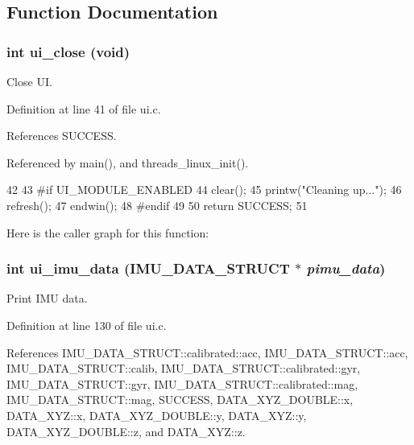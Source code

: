 \subsection{Function Documentation}
\hypertarget{group__ui_ga65d8b92b634da17c344458cd57e61f3e}{
\subsubsection[{ui\_\-close}]{\setlength{\rightskip}{0pt plus 5cm}int ui\_\-close (void)}}
\label{group__ui_ga65d8b92b634da17c344458cd57e61f3e}


Close UI. 



Definition at line 41 of file ui.c.



References SUCCESS.



Referenced by main(), and threads\_\-linux\_\-init().




\begin{DoxyCode}
42 {
43     #if UI_MODULE_ENABLED
44         clear();
45         printw("Cleaning up...\n");
46         refresh();
47         endwin();
48     #endif
49 
50           return SUCCESS;
51 }
\end{DoxyCode}




Here is the caller graph for this function:

\hypertarget{group__ui_ga7d5a9d9a75693709de408781d001a6a6}{
\subsubsection[{ui\_\-imu\_\-data}]{\setlength{\rightskip}{0pt plus 5cm}int ui\_\-imu\_\-data ({\bf IMU\_\-DATA\_\-STRUCT} $\ast$ {\em pimu\_\-data})}}
\label{group__ui_ga7d5a9d9a75693709de408781d001a6a6}


Print IMU data. 



Definition at line 130 of file ui.c.



References IMU\_\-DATA\_\-STRUCT::calibrated::acc, IMU\_\-DATA\_\-STRUCT::acc, IMU\_\-DATA\_\-STRUCT::calib, IMU\_\-DATA\_\-STRUCT::calibrated::gyr, IMU\_\-DATA\_\-STRUCT::gyr, IMU\_\-DATA\_\-STRUCT::calibrated::mag, IMU\_\-DATA\_\-STRUCT::mag, SUCCESS, DATA\_\-XYZ\_\-DOUBLE::x, DATA\_\-XYZ::x, DATA\_\-XYZ\_\-DOUBLE::y, DATA\_\-XYZ::y, DATA\_\-XYZ\_\-DOUBLE::z, and DATA\_\-XYZ::z.



